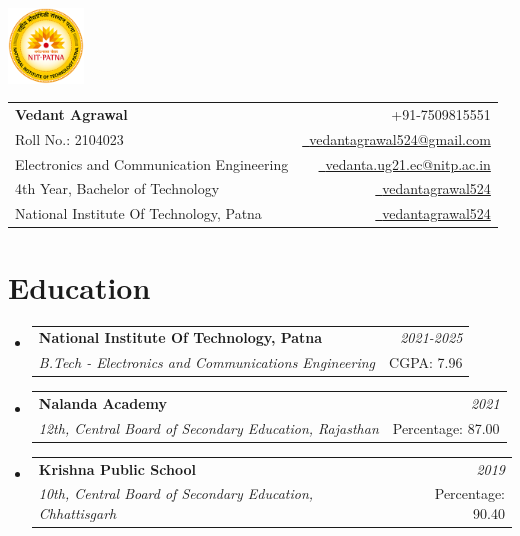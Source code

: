\documentclass[a4paper,11pt]{article}
\makeatletter
\newcommand{\resumeSubheading}[4]{
\vspace{0.5mm}\item
    \begin{tabular*}{0.98\textwidth}[t]{l@{\extracolsep{\fill}}r}
        \textbf{#1} & \textit{\footnotesize{#4}} \\
        \textit{\footnotesize{#3}} &  \footnotesize{#2}\\
    \end{tabular*}
    \vspace{-2.4mm}
}
\newcommand{\resumeSubHeadingListStart}{\begin{itemize}[leftmargin=*,labelsep=0mm]}
\newcommand{\resumeSubHeadingListEnd}{\end{itemize}\vspace{2mm}}
\newcommand{\name}{Vedant Agrawal} %
\newcommand{\course}{Electronics and Communication Engineering} %
\newcommand{\roll}{2104023} %
\newcommand{\phone}{7509815551} %
\newcommand{\emaila}{vedantagrawal524@gmail.com} %
\newcommand{\emailb}{vedanta.ug21.ec@nitp.ac.in} %
\makeatother
\begin{document}
\selectfont


\parbox{2.35cm}{%
\includegraphics[width=2cm,clip]{nitp_logo.png}
}
\parbox{\dimexpr\linewidth-2.8cm\relax}{
\begin{tabularx}{\linewidth}{L r} \\
  \textbf{\Large \name} & {\raisebox{0.0\height}{\footnotesize \faPhone}\ +91-\phone}\\
  {Roll No.: \roll} & \href{mailto:\emaila}{\raisebox{0.0\height}{\footnotesize \faEnvelope}\ {\emaila}} \\
  \course &  \href{mailto:\emailb}{\raisebox{0.0\height}{\footnotesize \faEnvelope}\ {\emailb}}\\
  {4th Year, Bachelor of Technology} &  \href{https://github.com/vedantagrawal524}{\raisebox{0.0\height}{\footnotesize \faGithub}\ {\href{https://github.com/vedantagrawal524}{vedantagrawal524}}} \\
  {National Institute Of Technology, Patna} & \href{https://www.linkedin.com/in/vedantagrawal524/}{\raisebox{0.0\height}{\footnotesize \faLinkedin}\ {vedantagrawal524}}
\end{tabularx}
}




\section{\textbf{Education}}
  \resumeSubHeadingListStart
    \resumeSubheading
      { National Institute Of Technology, Patna}{CGPA: 7.96}
      { B.Tech - Electronics and Communications Engineering}{2021-2025}
    \resumeSubheading
      { Nalanda Academy}{Percentage: 87.00}
      { 12th, Central Board of Secondary Education, Rajasthan}{2021}
    \resumeSubheading
      { Krishna Public School}{Percentage: 90.40}
      { 10th, Central Board of Secondary Education, Chhattisgarh}{2019}
  \resumeSubHeadingListEnd
\vspace{-5.5mm}
%
\end{document}
